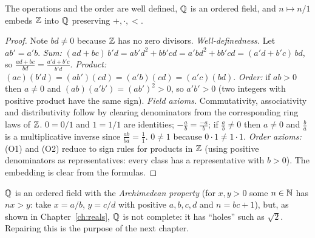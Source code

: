 \begin{theorem}\label{thm:Q}
	The operations and the order are well defined, $\mathbb{Q}$ is an ordered field, and $n\mapsto n/1$ embeds $\mathbb{Z}$ into $\mathbb{Q}$ preserving $+,\cdot,<$.
\end{theorem}
\begin{proof}
	Note $bd\neq0$ because $\mathbb{Z}$ has no zero divisors. \emph{Well-definedness.} Let $ab'=a'b$. \emph{Sum:} $(ad+bc)\,b'd=ab'd^2+bb'cd=a'bd^2+bb'cd=(a'd+b'c)\,bd$, so $\frac{ad+bc}{bd}=\frac{a'd+b'c}{b'd}$. \emph{Product:} $(ac)(b'd)=(ab')(cd)=(a'b)(cd)=(a'c)(bd)$. \emph{Order:} if $ab>0$ then $a\ne0$ and $(ab)(a'b')=(ab')^2>0$, so $a'b'>0$ (two integers with positive product have the same sign). \emph{Field axioms.} Commutativity, associativity and distributivity follow by clearing denominators from the corresponding ring laws of $\mathbb{Z}$. $0=0/1$ and $1=1/1$ are identities; $-\frac ab=\frac{-a}b$; if $\frac ab\neq0$ then $a\neq0$ and $\frac ba$ is a multiplicative inverse since $\frac{ab}{ba}=\frac11$. $0\ne1$ because $0\cdot1\neq1\cdot1$. \emph{Order axioms:} (O1) and (O2) reduce to sign rules for products in $\mathbb{Z}$ (using positive denominators as representatives: every class has a representative with $b>0$). The embedding is clear from the formulas.
\end{proof}

\begin{remark}
	$\mathbb{Q}$ is an ordered field with the \emph{Archimedean property} (for $x,y>0$ some $n\in\mathbb{N}$ has $nx>y$: take $x=a/b$, $y=c/d$ with positive $a,b,c,d$ and $n=bc+1$), but, as shown in Chapter~\ref{ch:reals}, $\mathbb{Q}$ is not complete: it has ``holes'' such as $\sqrt2$. Repairing this is the purpose of the next chapter.
\end{remark}
